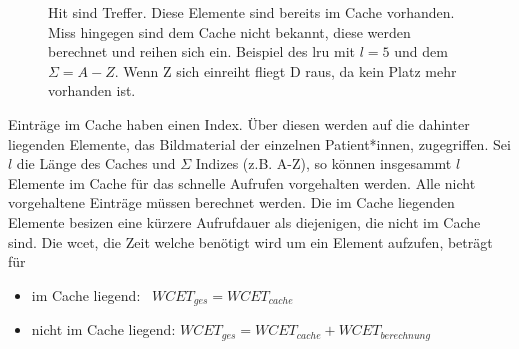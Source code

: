 \begin{figure}[b]\centering
{}
\caption[Beispiel des \ac{lru}]{Hit sind Treffer. Diese Elemente sind bereits im Cache vorhanden. Miss hingegen sind dem Cache nicht bekannt, diese werden berechnet und reihen sich ein. Beispiel des \ac{lru} mit $l=5$ und dem $\Sigma=A-Z$. Wenn Z sich einreiht fliegt D raus, da kein Platz mehr vorhanden ist.}\label{cap:lrucache}
\end{figure}\label{fig:lrucache}

Einträge im Cache haben einen Index. Über diesen werden auf die dahinter liegenden Elemente, das Bildmaterial der einzelnen Patient*innen, zugegriffen. Sei $l$ die Länge des Caches und $\Sigma$ Indizes (z.B. A-Z), so können insgesammt $l$ Elemente im Cache für das schnelle Aufrufen vorgehalten werden. Alle nicht vorgehaltene Einträge müssen berechnet werden. Die im Cache liegenden Elemente besizen eine kürzere Aufrufdauer als diejenigen, die nicht im Cache sind. Die \ac{wcet}, die Zeit welche benötigt wird um ein Element aufzufen, beträgt für

\begin{itemize}
  \setlength\itemsep{-0.5em}
\item im Cache liegend: \qquad\, $WCET_{ges}=WCET_{cache}$
\item nicht im Cache liegend: $WCET_{ges}=WCET_{cache} + WCET_{berechnung}$
\end{itemize}

